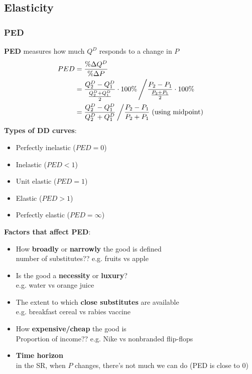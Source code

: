 \documentclass{article}
\begin{document}
\begin{multicols}{2}
\subsection{Elasticity}

\subsubsection{PED}
\textbf{PED} measures how much $Q^D$ responds to a change in $P$
\begin{equation*}
\begin{aligned}
	PED &= \frac{\%\Delta Q^D}{\%\Delta P}\\
	&= \frac{Q^D_2 - Q^D_1}{\frac{Q^D_2 + Q^D_1 }{2}}\cdot 100\% \left/ \frac{P_2 - P_1}{\frac{P_2 + P_1 }{2}}\cdot 100\%\right.\\
	&= \frac{Q^D_2 - Q^D_1}{Q^D_2 + Q^D_1} \left/ \frac{P_2 - P_1}{P_2 + P_1}\right. \text{(using midpoint)}\\
\end{aligned}
\end{equation*}
\textbf{Types of DD curves}:
\begin{itemize}
	\item Perfectly inelastic ($PED = 0$)
	\item Inelastic ($PED < 1$)
	\item Unit elastic ($PED = 1$)
	\item Elastic ($PED > 1$)
	\item Perfectly elastic ($PED = \infty$)\\
\end{itemize}
\textbf{Factors that affect PED}:
\begin{itemize}
	\item How \textbf{broadly} or \textbf{narrowly} the good is defined\\
	number of substitutes?? e.g. fruits vs apple
	\item Is the good a \textbf{necessity} or \textbf{luxury}?\\
	e.g. water vs orange juice
	\item The extent to which \textbf{close substitutes} are available\\
	e.g. breakfast cereal vs rabies vaccine
	\item How \textbf{expensive/cheap} the good is\\
	Proportion of income?? e.g. Nike vs nonbranded flip-flops
	\item \textbf{Time horizon}\\
	in the SR, when $P$ changes, there's not much we can do (PED is close to 0)\\

\end{itemize}
\end{multicols}
\end{document}
